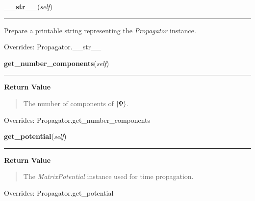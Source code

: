     \vspace{0.5ex}

\hspace{.8\funcindent}\begin{boxedminipage}{\funcwidth}

    \raggedright \textbf{\_\_str\_\_}(\textit{self})

    \vspace{-1.5ex}

    \rule{\textwidth}{0.5\fboxrule}
\setlength{\parskip}{2ex}
    Prepare a printable string representing the \textit{Propagator}
    instance.

\setlength{\parskip}{1ex}

      Overrides: Propagator.\_\_str\_\_

    \end{boxedminipage}

    \vspace{0.5ex}

\hspace{.8\funcindent}\begin{boxedminipage}{\funcwidth}

    \raggedright \textbf{get\_number\_components}(\textit{self})

    \vspace{-1.5ex}

    \rule{\textwidth}{0.5\fboxrule}
\setlength{\parskip}{2ex}
\setlength{\parskip}{1ex}
      \textbf{Return Value}
    \vspace{-1ex}

      \begin{quote}
      The number of components of
      $\Ket{\Psi}$.

      \end{quote}

      Overrides: Propagator.get\_number\_components

    \end{boxedminipage}

    \vspace{0.5ex}

\hspace{.8\funcindent}\begin{boxedminipage}{\funcwidth}

    \raggedright \textbf{get\_potential}(\textit{self})

    \vspace{-1.5ex}

    \rule{\textwidth}{0.5\fboxrule}
\setlength{\parskip}{2ex}
\setlength{\parskip}{1ex}
      \textbf{Return Value}
    \vspace{-1ex}

      \begin{quote}
      The \textit{MatrixPotential} instance used for time propagation.

      \end{quote}

      Overrides: Propagator.get\_potential

    \end{boxedminipage}

